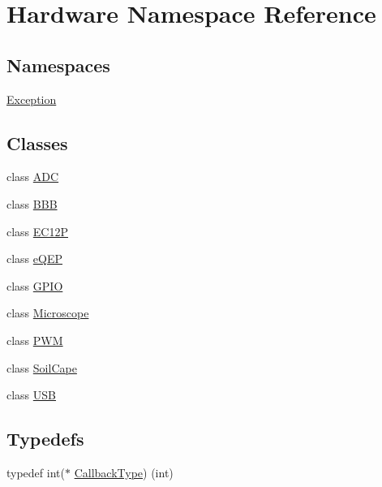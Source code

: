 \hypertarget{namespace_hardware}{}\section{Hardware Namespace Reference}
\label{namespace_hardware}
\subsection*{Namespaces}
\begin{DoxyCompactItemize}
\item 
 \hyperlink{namespace_hardware_1_1_exception}{Exception}
\end{DoxyCompactItemize}
\subsection*{Classes}
\begin{DoxyCompactItemize}
\item 
class \hyperlink{class_hardware_1_1_a_d_c}{A\+D\+C}
\item 
class \hyperlink{class_hardware_1_1_b_b_b}{B\+B\+B}
\item 
class \hyperlink{class_hardware_1_1_e_c12_p}{E\+C12\+P}
\item 
class \hyperlink{class_hardware_1_1e_q_e_p}{e\+Q\+E\+P}
\item 
class \hyperlink{class_hardware_1_1_g_p_i_o}{G\+P\+I\+O}
\item 
class \hyperlink{class_hardware_1_1_microscope}{Microscope}
\item 
class \hyperlink{class_hardware_1_1_p_w_m}{P\+W\+M}
\item 
class \hyperlink{class_hardware_1_1_soil_cape}{Soil\+Cape}
\item 
class \hyperlink{class_hardware_1_1_u_s_b}{U\+S\+B}
\end{DoxyCompactItemize}
\subsection*{Typedefs}
\begin{DoxyCompactItemize}
\item 
typedef int($\ast$ \hyperlink{namespace_hardware_a5ba2e4bdfa2bbd8b551b1d5b2a0c61fd}{Callback\+Type}) (int)
\end{DoxyCompactItemize}

